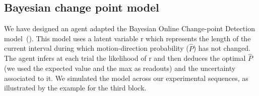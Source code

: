 \documentclass[profile,final,english, draft]{article}%
\newcommand{\citep}[1]{(\cite{#1})}
\begin{document}
\subsection{Bayesian change point model}

We have designed an agent adapted the Bayesian Online Change-point Detection model~\citep{AdamsMackay2007}. This model uses a latent variable r which represents the length of the current interval during which motion-direction probability ($\hat{P}$) has not changed. The agent infers at each trial the likelihood  of r and then deduces the optimal $\hat{P}$ (we used the expected value and the max as readouts) and the uncertainty associated to it. We simulated the model across our experimental sequences, as illustrated by the example for the third block.


%
%
%
%
\end{document}
